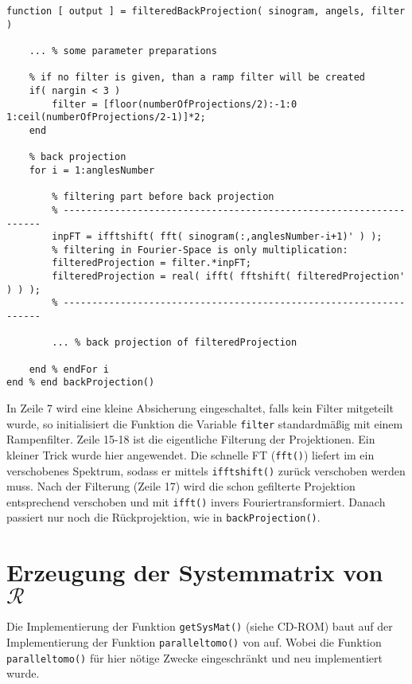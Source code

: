 \begin{lstlisting}[style=Matlab-editor,basicstyle=\color{black}\ttfamily\footnotesize, backgroundcolor=\color{white}]
function [ output ] = filteredBackProjection( sinogram, angels, filter )
	
	... % some parameter preparations
		
	% if no filter is given, than a ramp filter will be created 
	if( nargin < 3 )
		filter = [floor(numberOfProjections/2):-1:0 1:ceil(numberOfProjections/2-1)]*2;
	end
	
	% back projection
	for i = 1:anglesNumber
	
		% filtering part before back projection
		% ------------------------------------------------------------------
		inpFT = ifftshift( fft( sinogram(:,anglesNumber-i+1)' ) );        
		% filtering in Fourier-Space is only multiplication:        
		filteredProjection = filter.*inpFT;
		filteredProjection = real( ifft( fftshift( filteredProjection' ) ) );
		% ------------------------------------------------------------------
		
		... % back projection of filteredProjection
		
	end % endFor i
end % end backProjection() 
\end{lstlisting}
\vspace{12pt}
In Zeile 7 wird eine kleine Absicherung eingeschaltet, falls kein Filter mitgeteilt wurde, so initialisiert die Funktion die Variable \verb|filter| standardmäßig mit einem Rampenfilter. Zeile 15-18 ist die eigentliche Filterung der Projektionen. Ein kleiner Trick wurde hier angewendet. Die schnelle FT (\verb|fft()|) liefert im \MATLAB ein verschobenes Spektrum, sodass er mittels \verb|ifftshift()| zurück verschoben werden muss. Nach der Filterung (Zeile 17) wird die schon gefilterte Projektion entsprechend verschoben und mit \verb|ifft()| invers Fouriertransformiert. Danach passiert nur noch die Rückprojektion, wie in \verb|backProjection()|.

\section{Erzeugung der Systemmatrix von $\mathcal{R}$}
\label{cha:A.4}

Die Implementierung der Funktion \verb|getSysMat()| (siehe CD-ROM) baut auf der Implementierung der Funktion \verb|paralleltomo()| von \cite{Hansen} auf. Wobei die Funktion \verb|paralleltomo()| für hier nötige Zwecke eingeschränkt und neu implementiert wurde. 


